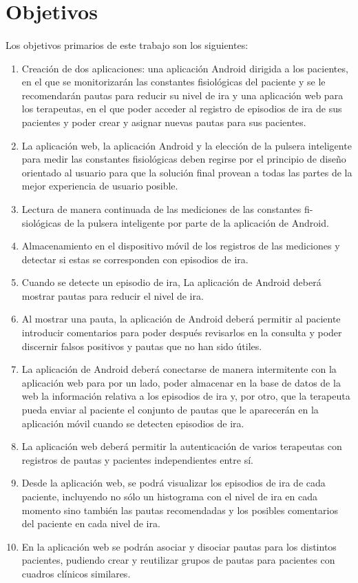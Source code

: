 \section{Objetivos}
\label{sec:objetivos}

\paragraph{}
Los objetivos primarios de este trabajo son los siguientes:
\begin{enumerate}
    \item Creación de dos aplicaciones: una aplicación Android dirigida a los pacientes, en el que se monitorizarán las constantes fisiológicas del paciente y se le recomendarán pautas para reducir su nivel de ira y una aplicación web para los terapeutas, en el que poder acceder al registro de episodios de ira de sus pacientes y poder crear y asignar nuevas pautas para sus pacientes.
    \item La aplicación web, la aplicación Android y la elección de la pulsera inteligente para medir las constantes fisiológicas deben regirse por el principio de diseño orientado al usuario para que la solución final provean a todas las partes de la mejor experiencia de usuario posible.
    \item Lectura de manera continuada de las mediciones de las constantes fi-\\siológicas de la pulsera inteligente por parte de la aplicación de Android.
    \item Almacenamiento en el dispositivo móvil de los registros de las mediciones y detectar si estas se corresponden con episodios de ira.
    \item Cuando se detecte un episodio de ira, La aplicación de Android deberá mostrar pautas para reducir el nivel de ira.
    \item Al mostrar una pauta, la aplicación de Android deberá permitir al paciente introducir comentarios para poder después revisarlos en la consulta y poder discernir falsos positivos y pautas que no han sido útiles.
    \item La aplicación de Android deberá conectarse de manera intermitente con la aplicación web para por un lado, poder almacenar en la base de datos de la web la información relativa a los episodios de ira y, por otro, que la terapeuta pueda enviar al paciente el conjunto de pautas que le aparecerán en la aplicación móvil cuando se detecten episodios de ira.
    \item La aplicación web deberá permitir la autenticación de varios terapeutas con registros de pautas y pacientes independientes entre sí.
    \item Desde la aplicación web, se podrá visualizar los episodios de ira de cada paciente, incluyendo no sólo un histograma con el nivel de ira en cada momento sino también las pautas recomendadas y los posibles comentarios del paciente en cada nivel de ira.
    \item En la aplicación web se podrán asociar y disociar pautas para los distintos pacientes, pudiendo crear y reutilizar grupos de pautas para pacientes con cuadros clínicos similares.
\end{enumerate}

